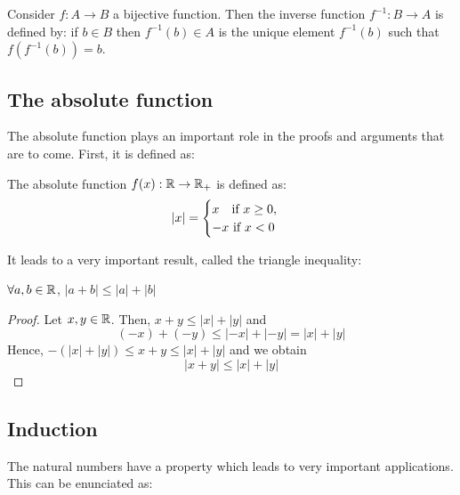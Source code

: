 \begin{definition}
    Consider $f: A \to B$ a bijective function. Then the inverse function $f^{-1}: B \to A$ is defined by: if $b \in B$ then $f^{-1}(b) \in A$ is the unique element $f^{-1}(b)$ such that $f(f^{-1}(b)) = b$.
\end{definition}

\subsection{The absolute function}

The absolute function plays an important role in the proofs and arguments that are to come. First, it is defined as:

\begin{definition}
    The absolute function $f(x): \mathbb{R} \to \mathbb{R}_+$ is defined as:
    \begin{equation}
        |x| = \begin{cases}
            x \: \: \:\textnormal{ if } x \geq 0, \\
            -x \textnormal{ if } x < 0
        \end{cases}
    \end{equation}
\end{definition}

\vspace{1em}
It leads to a very important result, called the triangle inequality:

\begin{theorem}
    $\forall a, b \in \mathbb{R}$, $|a+b| \leq |a| + |b|$
\end{theorem}

\begin{proof}
    Let $x, y \in \mathbb{R}$. Then, $x + y \leq |x| + |y|$ and
    \begin{equation*}
        (-x) + (-y) \leq |-x|+|-y| = |x| + |y|
    \end{equation*}
    Hence, $-(|x|+|y|) \leq x+y \leq |x| + |y|$ and we obtain
    \begin{equation*}
        |x+y| \leq |x| + |y|
    \end{equation*}
\end{proof}

\subsection{Induction}

The natural numbers have a property which leads to very important applications. This can be enunciated as:


